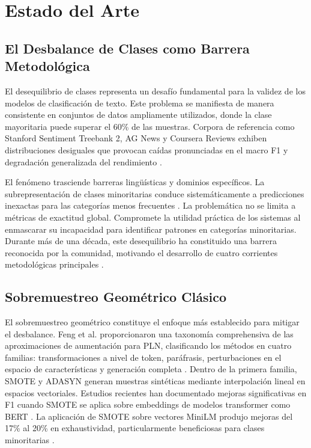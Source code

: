 
\chapter{Estado del Arte}
\label{ch:estado_arte}

\section{El Desbalance de Clases como Barrera Metodológica}

El desequilibrio de clases representa un desafío fundamental para la validez de los modelos de clasificación de texto. Este problema se manifiesta de manera consistente en conjuntos de datos ampliamente utilizados, donde la clase mayoritaria puede superar el 60\% de las muestras. Corpora de referencia como Stanford Sentiment Treebank 2, AG News y Coursera Reviews exhiben distribuciones desiguales que provocan caídas pronunciadas en el macro F1 y degradación generalizada del rendimiento \cite{gopali2024applicability}.

El fenómeno trasciende barreras lingüísticas y dominios específicos. La subrepresentación de clases minoritarias conduce sistemáticamente a predicciones inexactas para las categorías menos frecuentes \cite{whitehouse2023llm}. La problemática no se limita a métricas de exactitud global. Compromete la utilidad práctica de los sistemas al enmascarar su incapacidad para identificar patrones en categorías minoritarias. Durante más de una década, este desequilibrio ha constituido una barrera reconocida por la comunidad, motivando el desarrollo de cuatro corrientes metodológicas principales \cite{gopali2024applicability}.

\section{Sobremuestreo Geométrico Clásico}

El sobremuestreo geométrico constituye el enfoque más establecido para mitigar el desbalance. Feng et al. proporcionaron una taxonomía comprehensiva de las aproximaciones de aumentación para PLN, clasificando los métodos en cuatro familias: transformaciones a nivel de token, paráfrasis, perturbaciones en el espacio de características y generación completa \cite{feng2021survey}. Dentro de la primera familia, SMOTE \cite{chawla2002smote} y ADASYN \cite{he2008adasyn} generan muestras sintéticas mediante interpolación lineal en espacios vectoriales. Estudios recientes han documentado mejoras significativas en F1 cuando SMOTE se aplica sobre embeddings de modelos transformer como BERT \cite{cloutier2023fine}. La aplicación de SMOTE sobre vectores MiniLM produjo mejoras del 17\% al 20\% en exhaustividad, particularmente beneficiosas para clases minoritarias \cite{taskiran2025comprehensive}.

